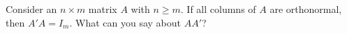 \item [3.4] Consider an $n \times m$ matrix $A$ with $n \geq m$.
If all columns of $A$ are orthonormal, then $A' A = I_m$.
What can you say about $AA'$?
